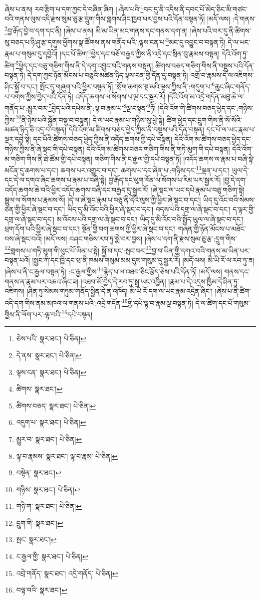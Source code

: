 ཞེས་པ་ནས། རབ་རྩིག་པ་དག་ཀྱང་དེ་བཞིན་ཞིག །:ཞེས་པའི་\footnote{ཅེས་པའི་  སྣར་ཐང་།  པེ་ཅིན། }བར་དུ་ནི་འདིས་ནི་དབང་པོ་མེད་ཅིང་མི་གཙང་བའི་གནས་ལུས་འདི་རྫས་སུམ་ཅུ་རྩ་དྲུག་གིས་གླགས་ཤིང་ཁྱབ་པར་བྱས་པའི་དོན་བསྟན་ཏོ། །མདོ་ལས། :དེ་གནས་\footnote{དེ་ནས་  སྣར་ཐང་།  པེ་ཅིན། }བྱ་རྒོད་བྱེ་བ་དག་དང་ནི། །ཞེས་པ་ནས། མི་མ་ཡིན་མང་གནས་དང་གནས་དག་ན། །ཞེས་པའི་བར་དུ་ནི་ཚིགས་སུ་བཅད་པ་ཉི་ཤུ་རྩ་དགུས་ཕྱོགས་སྣ་ཚོགས་ནས་གནོད་པའི་:ལྟས་ངན་པ་\footnote{ལྟས་ངན་  སྣར་ཐང་།  པེ་ཅིན། }མང་དུ་འབྱུང་བ་བསྟན་ཏེ། དེ་ལ་ཡང་རྣམ་པ་གསུམ་དུ་དབྱེའོ། །དང་པོ་ཚིག་\footnote{ཚིགས་  སྣར་ཐང་། }ཕྱེད་དང་བཅོ་བརྒྱད་ཀྱིས་ནི་འདྲེ་དང་སྲིན་བུ་རྣམས་བསྟན། དེའི་འོག་ཏུ་ཚིག་\footnote{ཚིགས་བཅད་  སྣར་ཐང་།  པེ་ཅིན། }ཕྱེད་དང་བཅུ་གཅིག་གིས་ནི་དེ་དག་འབྱུང་བའི་གནས་བསྟན། ཚིགས་བཅད་གཅིག་གིས་ནི་བསྡུས་པའི་དོན་བསྟན་ཏེ། དེ་དག་ཀྱང་ཉོན་མོངས་པ་བཅུའི་མཚན་ཉིད་ལྟས་ངན་གྱི་དོན་དུ་བསྟན་ཏེ། འགྲོ་བ་རྣམས་དེ་ལ་འཇིགས་ཤིང་སྐྱོ་བ་དང་། སྤོང་དུ་གཞུག་པའི་ཕྱིར་བསྟན་ཏོ། །སྲོག་ཆགས་སྔ་མའི་ལྟས་ཀྱིས་ནི་:གདུག་པ་\footnote{འདུག་པ་  སྣར་ཐང་།  པེ་ཅིན། }ཆུང་ཞིང་གནོད་པ་བགས་ཀྱིས་བྱེད་པའི་དོན་ཏེ། འདོད་ཆགས་ལ་སོགས་པ་ལྔ་དང་སྦྱར་རོ། །དེའི་འོག་མ་འདྲེ་གདོན་མཐུ་ཆེ་ལ་གནོད་པ་:མྱུར་བར་\footnote{མྱུར་བ་  སྣར་ཐང་།  པེ་ཅིན། }བྱེད་པའི་དཔེས་ནི་:ལྟ་བ་རྣམ་པ་\footnote{ལྟ་བ་རྣམས་  སྣར་ཐང་། ལྟ་བ་རྣམ་  པེ་ཅིན། }ལྔ་བསྟན་\footnote{བསྟེན་  སྣར་ཐང་། }ཏོ། །དེའི་འོག་གི་ཚིགས་བཅད་ཕྱེད་དང་:གཉིས་ཀྱིས་\footnote{གཉིས་  སྣར་ཐང་།  པེ་ཅིན། }ནི་ཉེས་པའི་སྐྱོན་བསྡུ་བ་བསྟན། དེ་ལ་ཡང་རྣམ་པ་གཉིས་སུ་ཕྱེ་སྟེ། ཚིག་ཕྱེད་དང་དྲུག་གིས་ནི་སོ་སོའི་མཚན་ཉིད་ཅི་འདྲ་བ་བསྟན། དེའི་འོག་མ་ཚིགས་བཅད་ཕྱེད་ཀྱིས་ནི་བསྡུས་པའི་དོན་བསྟན། དང་པོ་ལ་ཡང་རྣམ་པ་ལྔར་དབྱེ་སྟེ། དང་པོའི་ཚིགས་བཅད་ཕྱེད་ཀྱིས་ནི་འདོད་ཆགས་ཀྱི་དཔེ་བསྟན། དེའི་འོག་མ་ཚིགས་བཅད་ཕྱེད་དང་གཉིས་ཀྱིས་ནི་ཞེ་སྡང་གི་དཔེ་བསྟན། དེའི་འོག་མ་ཚིགས་བཅད་གཅིག་གིས་ནི་གཏི་མུག་གི་དཔེ་བསྟན། དེའི་འོག་མ་གཅིག་གིས་ནི་ཐེ་ཚོམ་གྱི་དཔེ་བསྟན། གཅིག་གིས་ནི་ང་རྒྱལ་གྱི་དཔེ་བསྟན་ཏོ། །འདོད་ཆགས་ལ་རྣམ་པ་བཞི་སྟེ་མངོན་དུ་ཆགས་པ་དང་། ཆགས་པར་འགྱུར་བ་དང་། ཆགས་པ་དང་ཞེན་པ་:གཉིས་དང་\footnote{གཉི་ག་  སྣར་ཐང་།  པེ་ཅིན། }ལྡན་པ་དང་། ཡུལ་དེ་དང་དེ་ལ་དགའ་ཞིང་ཆགས་པ་རྣམ་པ་བཞི་སྟེ། བྱ་རྒོད་དང་ཕུག་རོན་ལ་སོགས་པ་རིམ་པར་སྦྱར་རོ། །བྱ་དེ་དག་འདོད་ཆགས་ཆེ་བའི་ཕྱིར་འདོད་ཆགས་བཞི་དང་བརྒྱད་དུ་སྦྱར་རོ། །ཞེ་སྡང་ལ་ཡང་དཔེ་རྣམ་པ་བཅུ་གཅིག་སྟེ། སྦྲུལ་ལ་སོགས་པ་རྣམས་སོ། །དེ་ལ་ཞེ་སྡང་རྣམ་པ་བཅུ་ནི་དེའི་ལུས་ཀྱི་ཕྱིར་ཞེ་སྡང་བ་དང་། ཡིད་དུ་འོང་བའི་སེམས་ཅན་གྱི་ཕྱིར་ཞེ་སྡང་བ་དང་། ཡིད་དུ་མི་འོང་བའི་ཕྱིར་ཞེ་སྡང་བ་དང་། འདས་པའི་དགྲ་ལ་ཞེ་སྡང་བ་དང་། ད་ལྟར་གྱི་དགྲ་ལ་ཞེ་སྡང་བ་དང་། མ་འོངས་པའི་དགྲ་ལ་ཞེ་སྡང་བ་དང་། ཡིད་དུ་མི་འོང་བའི་སྤྱོད་ཡུལ་ལ་ཞེ་སྡང་བ་དང་། ཕྲག་དོག་པའི་ཕྱིར་ཞེ་སྡང་བ་དང་། སྔོན་གྱི་བག་ཆགས་ཀྱི་ཕྱིར་ཞེ་སྡང་བ་དང་། གཞན་གྱི་ཉོན་མོངས་པ་མཐོང་བས་ཞེ་སྡང་བའོ། །མདོ་ལས། བཤང་གཅིས་རབ་ཏུ་སྨེ་བར་བྱས། །ཞེས་པ་དག་ནི་རྫས་སུམ་ཅུ་རྩ་:དྲུག་གིས་\footnote{དྲུག་གི་  སྣར་ཐང་། }གླགས་པ་གཏི་མུག་གི་ཕུང་པོ་ཡིན་པ་སྟེ། སྐྱོ་བ་དང་:སྤང་བར་\footnote{སྤང་  སྣར་ཐང་། }བྱ་བ་ཡིན་གྱི་དགའ་བའི་གནས་མ་ཡིན་པར་བསྟན་པའོ། །སྤྱང་ཀི་དང་ཁྱི་དང་ཝ་ནི་ཁམས་གསུམ་མམ་དུས་གསུམ་དུ་སྦྱར་རོ། །མདོ་ལས། མི་ཡི་རོ་ལ་རབ་ཏུ་ཟ། །ཞེས་པ་ནི་ང་རྒྱལ་བསྟན་ཏེ། :ང་རྒྱལ་གྱིས་\footnote{ང་རྒྱལ་གྱི་  སྣར་ཐང་།  པེ་ཅིན། }རྙེད་པ་ལ་འཐབ་ཅིང་རྩོད་ཅེས་པའི་དོན་ཏོ། །མདོ་ལས། གནས་དང་གནས་ན་རྣམ་པར་འཆའ་ཞིང་ཟ། །འཐབ་མོ་བྱེད་དེ་རབ་ཏུ་སྒྲ་ཡང་འབྱིན། །རྣམ་པ་དེ་འདྲས་ཁྱིམ་དེ་ཤིན་ཏུ་འཇིགས། །ཤིན་ཏུ་སེམས་གཏུམ་གནོད་སྦྱིན་དེ་ན་འཁོད། མི་ཡི་རོ་དག་ལ་ཡང་རྣམ་འདྲེན་ཞིང་། །ཞེས་པ་ནི་ཚིག་འདི་དག་གིས་ནམ་མཁའ་ལ་གནས་པའི་:འདྲེ་གདོན་\footnote{འབྲེ་གནོད་  སྣར་ཐང་། འདྲེ་གནོད་  པེ་ཅིན། }གྱི་དཔེ་ལྟ་བ་རྣམ་ལྔ་བསྟན་ཏེ། དེ་ལ་ཚིག་དང་པོ་གསུམ་གྱིས་ནི་ལོག་པར་:ལྟ་བའི་\footnote{བལྟ་བའི་  སྣར་ཐང་། }དཔེ་བསྟན། 